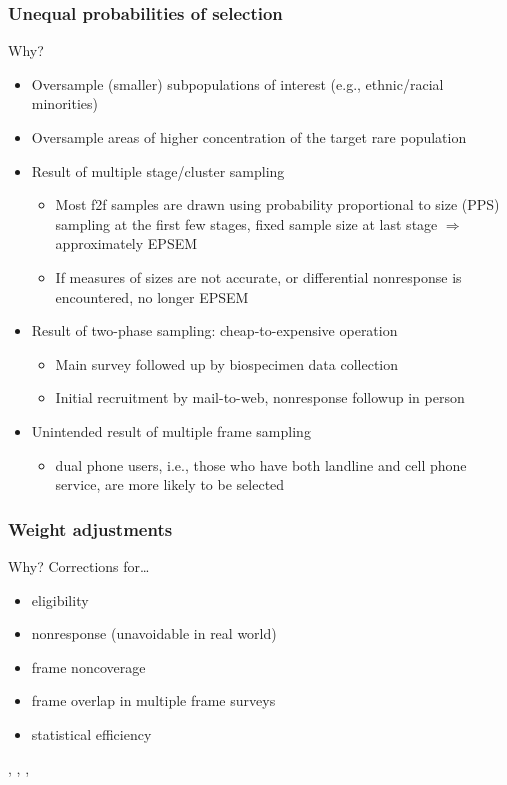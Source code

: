\documentclass[aspectratio=43]{beamer}
\begin{document}
\begin{frame}\frametitle{Unequal probabilities of selection}

Why?

\begin{itemize}
    \item Oversample (smaller) subpopulations of interest (e.g., ethnic/racial minorities)
    \item Oversample areas of higher concentration of the target rare population
    \item Result of multiple stage/cluster sampling
    \begin{itemize}
        \item Most f2f samples are drawn using probability proportional to size (PPS) 
            sampling at the first few stages,
            fixed sample size at last stage $\Rightarrow$ approximately EPSEM
        \item If measures of sizes are not accurate, or differential nonresponse is 
            encountered, no longer EPSEM
    \end{itemize}
    \item Result of two-phase sampling: cheap-to-expensive operation
    \begin{itemize}
        \item Main survey followed up by biospecimen data collection
        \item Initial recruitment by mail-to-web, nonresponse followup in person
    \end{itemize}
    \item Unintended result of multiple frame sampling
        \begin{itemize}
            \item dual phone users, i.e., those who have both landline and cell phone service, are more likely to be selected
        \end{itemize}
\end{itemize}

\end{frame}

\begin{frame}\frametitle{Weight adjustments}

Why? Corrections for\ldots

\begin{itemize}
    \item eligibility
    \item nonresponse (unavoidable in real world)
    \item frame noncoverage
    \item frame overlap in multiple frame surveys
    \item statistical efficiency
\end{itemize}

\citet{kalton:flores:cervantes:2003},
\citet{valliant:dever:kreuter:2013},
\citet{valliant:dever:2017},
\citet{kolenikov:2016}

\end{frame}
\end{document}
